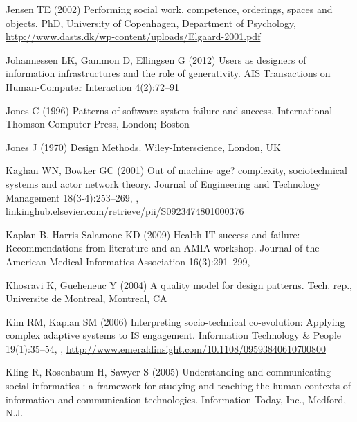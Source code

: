 \documentclass{article}
\begin{document}
\begin{thebibliography}{193}
Jensen TE (2002) Performing social work, competence, orderings, spaces and
  objects. {PhD}, University of Copenhagen, Department of Psychology,
  \urlprefix\url{http://www.dasts.dk/wp-content/uploads/Elgaard-2001.pdf}

Johannessen LK, Gammon D, Ellingsen G (2012) Users as designers of information
  infrastructures and the role of generativity. {AIS} Transactions on
  Human-Computer Interaction 4(2):72--91

Jones C (1996) Patterns of software system failure and success. International
  Thomson Computer Press, London; Boston

Jones J (1970) Design Methods. Wiley-Interscience, London, {UK}

Kaghan WN, Bowker GC (2001) Out of machine age? complexity, sociotechnical
  systems and actor network theory. Journal of Engineering and Technology
  Management 18(3-4):253--269, ,
  \urlprefix\url{linkinghub.elsevier.com/retrieve/pii/S0923474801000376}

Kaplan B, Harris-Salamone KD (2009) Health {IT} success and failure:
  Recommendations from literature and an {AMIA} workshop. Journal of the
  American Medical Informatics Association 16(3):291--299,

Khosravi K, Gueheneuc Y (2004) A quality model for design patterns. Tech. rep.,
  Universite de Montreal, Montreal, {CA}

Kim RM, Kaplan SM (2006) Interpreting socio-technical co-evolution: Applying
  complex adaptive systems to {IS} engagement. Information Technology \& People
  19(1):35--54, ,
  \urlprefix\url{http://www.emeraldinsight.com/10.1108/09593840610700800}

Kling R, Rosenbaum H, Sawyer S (2005) Understanding and communicating social
  informatics : a framework for studying and teaching the human contexts of
  information and communication technologies. Information Today, Inc., Medford,
  {N.J.}


\end{thebibliography}
\end{document}
